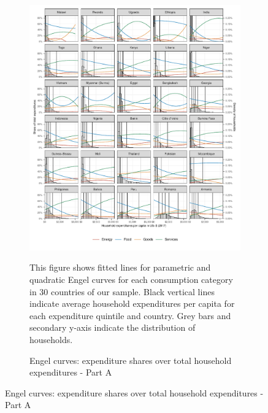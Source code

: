 \begin{figure}[ht!]
  \centering
  \caption{Engel curves: expenditure shares over total household expenditures} \label{fig:Engel}
  \begin{subfigure}[b]{\textwidth}
  \centering
  \includegraphics{1_Figures/Analysis_Parametric_Engel_Curves/Parametric_EC_0_A.pdf}
  \caption{Engel curves: expenditure shares over total household expenditures - Part A} \label{fig:Engel_1}
  \begin{subcaption2}
    This figure shows fitted lines for parametric and quadratic Engel curves for each consumption category in 30 countries of our sample. Black vertical lines indicate average household expenditures per capita for each expenditure quintile and country. Grey bars and secondary y-axis indicate the distribution of households.
  \end{subcaption2}
  \end{subfigure}
\end{figure}

\clearpage

